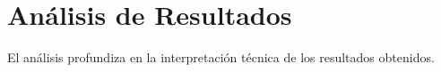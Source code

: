 \section{Análisis de Resultados}

El análisis profundiza en la interpretación técnica de los resultados obtenidos.